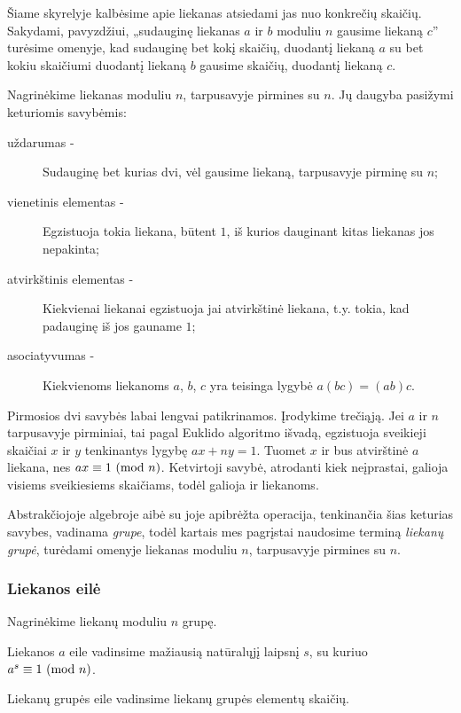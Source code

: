 Šiame skyrelyje kalbėsime apie liekanas atsiedami jas nuo konkrečių
skaičių. Sakydami, pavyzdžiui, „sudauginę liekanas $a$ ir $b$ moduliu $n$
gausime liekaną $c$'' turėsime omenyje, kad sudauginę bet kokį skaičių,
duodantį liekaną $a$ su bet kokiu skaičiumi duodantį liekaną $b$ gausime
skaičių, duodantį liekaną $c$.

Nagrinėkime liekanas moduliu $n$, tarpusavyje pirmines su $n$. Jų daugyba pasižymi
keturiomis savybėmis:

\begin{description}
  \item[uždarumas -] Sudauginę bet kurias dvi, vėl gausime liekaną,
    tarpusavyje pirminę su $n$;
  \item[vienetinis elementas -] Egzistuoja tokia liekana, būtent $1$, iš
    kurios dauginant kitas liekanas jos nepakinta;
  \item[atvirkštinis elementas -] Kiekvienai liekanai egzistuoja jai
    atvirkštinė liekana, t.y. tokia, kad padauginę iš jos gauname $1$;
  \item[asociatyvumas -] Kiekvienoms liekanoms $a$, $b$, $c$ yra teisinga
    lygybė $a(bc) = (ab)c$.
\end{description}

Pirmosios dvi savybės labai lengvai patikrinamos. Įrodykime trečiąją. Jei
$a$ ir $n$ tarpusavyje pirminiai, tai pagal Euklido algoritmo išvadą,
egzistuoja sveikieji skaičiai $x$ ir $y$ tenkinantys lygybę $ax + ny = 1$.
Tuomet $x$ ir bus atvirštinė $a$ liekana, nes $ax \equiv 1 \ (\text{mod } n)$. Ketvirtoji
savybė, atrodanti kiek neįprastai, galioja visiems sveikiesiems skaičiams,
todėl galioja ir liekanoms.

Abstrakčiojoje algebroje aibė su joje apibrėžta operacija, tenkinančia šias
keturias savybes, vadinama \emph{grupe}, todėl kartais mes pagrįstai
naudosime terminą \emph{liekanų grupė}, turėdami omenyje liekanas moduliu
$n$, tarpusavyje pirmines su $n$.

\subsubsection{Liekanos eilė}

Nagrinėkime liekanų moduliu $n$ grupę.

\begin{api}
  Liekanos $a$ eile vadinsime mažiausią natūralųjį laipsnį $s$, su kuriuo
  $a^{s} \equiv 1 \ (\text{mod } n)$.
\end{api}

\begin{api}
  Liekanų grupės eile vadinsime liekanų grupės elementų skaičių.
\end{api}

